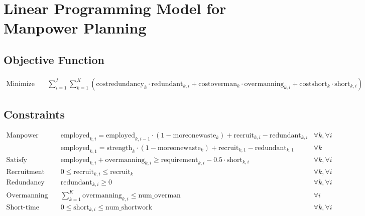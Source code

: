 \documentclass{article}
\begin{document}
\section*{Linear Programming Model for Manpower Planning}

\subsection*{Objective Function}
\begin{align*}
\text{Minimize} \quad & \sum_{i=1}^{I} \sum_{k=1}^{K} \left( \text{costredundancy}_{k} \cdot \text{redundant}_{k,i} + \text{costoverman}_{k} \cdot \text{overmanning}_{k,i} + \text{costshort}_{k} \cdot \text{short}_{k,i} \right)
\end{align*}

\subsection*{Constraints}
\begin{align*}
\text{Manpower Balance:} \quad & \text{employed}_{k,i} = \text{employed}_{k,i-1} \cdot (1 - \text{moreonewaste}_{k}) + \text{recruit}_{k,i} - \text{redundant}_{k,i} & \forall k, \forall i\\
& \text{employed}_{k,1} = \text{strength}_{k} \cdot (1 - \text{moreonewaste}_{k}) + \text{recruit}_{k,1} - \text{redundant}_{k,1} & \forall k \\
\text{Satisfy Requirement:} \quad & \text{employed}_{k,i} + \text{overmanning}_{k,i} \geq \text{requirement}_{k,i} - 0.5 \cdot \text{short}_{k,i} & \forall k, \forall i \\
\text{Recruitment Limits:} \quad & 0 \leq \text{recruit}_{k,i} \leq \text{recruit}_{k} & \forall k, \forall i \\
\text{Redundancy Limits:} \quad & \text{redundant}_{k,i} \geq 0 & \forall k, \forall i \\
\text{Overmanning Limits:} \quad & \sum_{k=1}^{K} \text{overmanning}_{k,i} \leq \text{num\_overman} & \forall i \\
\text{Short-time Limits:} \quad & 0 \leq \text{short}_{k,i} \leq \text{num\_shortwork} & \forall k, \forall i \\
\end{align*}
\end{document}
